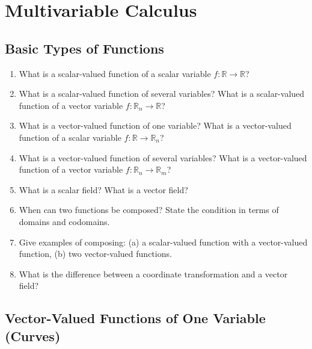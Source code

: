 \section{Multivariable Calculus}

\subsection{Basic Types of Functions}

\begin{enumerate}
  \item What is a scalar-valued function of a scalar variable $f:\mathbb{R} \to \mathbb{R}$?
  \item What is a scalar-valued function of several variables? What is a scalar-valued function of a vector variable $f:\mathbb{R}_n \to \mathbb{R}$?
  \item What is a vector-valued function of one variable? What is a vector-valued function of a scalar variable $f:\mathbb{R} \to \mathbb{R}_n$?
  \item What is a vector-valued function of several variables? What is a vector-valued function of a vector variable $f:\mathbb{R}_n \to \mathbb{R}_m$?
  \item What is a scalar field? What is a vector field?
  \item When can two functions be composed? State the condition in terms of domains and codomains.
  \item Give examples of composing:
    (a) a scalar-valued function with a vector-valued function,
    (b) two vector-valued functions.
  \item What is the difference between a coordinate transformation and a vector field?
\end{enumerate}

\subsection{Vector-Valued Functions of One Variable (Curves)}

